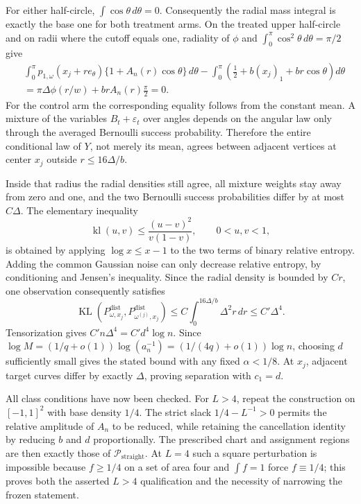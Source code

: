 For either half-circle, \(\int\cos\theta\,d\theta=0\).  Consequently the radial mass integral is exactly the base one for both treatment arms.  On the treated upper half-circle and on radii where the cutoff equals one, radiality of \(\phi\) and
\(\int_0^\pi\cos^2\theta\,d\theta=\pi/2\) give
\[
\begin{aligned}
 &\int_0^\pi p_{1,\omega}(x_j+r e_\theta)
       \{1+A_n(r)\cos\theta\}\,d\theta
 -\int_0^\pi \left(\frac12+b(x_j)_1+br\cos\theta\right)d\theta\\
 &=\pi\Delta\phi(r/w)+brA_n(r)\frac\pi2=0.
\end{aligned}
\]
For the control arm the corresponding equality follows from the constant mean.  A mixture of the variables \(B_t+\varepsilon_t\) over angles depends on the angular law only through the averaged Bernoulli success probability.  Therefore the entire conditional law of \(Y\), not merely its mean, agrees between adjacent vertices at center \(x_j\) outside \(r\leq16\Delta/b\).

Inside that radius the radial densities still agree, all mixture weights stay away from zero and one, and the two Bernoulli success probabilities differ by at most \(C\Delta\).  The elementary inequality
\[
 \operatorname{kl}(u,v)\leq\frac{(u-v)^2}{v(1-v)},\qquad 0<u,v<1,
\]
is obtained by applying \(\log x\leq x-1\) to the two terms of binary relative entropy.  Adding the common Gaussian noise can only decrease relative entropy, by conditioning and Jensen's inequality.  Since the radial density is bounded by \(Cr\), one observation consequently satisfies
\[
 \operatorname{KL}(P_{\omega,x_j}^{\mathrm{dist}},P_{\omega^{(j)},x_j}^{\mathrm{dist}})
 \leq C\int_0^{16\Delta/b}\Delta^2r\,dr\leq C'\Delta^4.
\]
Tensorization gives \(C'n\Delta^4=C'd^4\log n\).  Since
\(\log M=(1/q+o(1))\log(a_n^{-1})=(1/(4q)+o(1))\log n\), choosing \(d\) sufficiently small gives the stated bound with any fixed \(\alpha<1/8\).  At \(x_j\), adjacent target curves differ by exactly \(\Delta\), proving separation with \(c_1=d\).

All class conditions have now been checked.  For \(L>4\), repeat the construction on \([-1,1]^2\) with base density \(1/4\).  The strict slack \(1/4-L^{-1}>0\) permits the relative amplitude of \(A_n\) to be reduced, while retaining the cancellation identity by reducing \(b\) and \(d\) proportionally.  The prescribed chart and assignment regions are then exactly those of \(\mathcal P_{\mathrm{straight}}\).  At \(L=4\) such a square perturbation is impossible because \(f\geq1/4\) on a set of area four and \(\int f=1\) force \(f\equiv1/4\); this proves both the asserted \(L>4\) qualification and the necessity of narrowing the frozen statement.